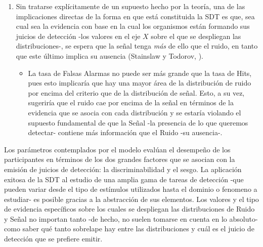 \begin{enumerate}
\item Sin tratarse explícitamente de un supuesto hecho por la teoría, una de las implicaciones directas de la forma en que está constituida la SDT es que, sea cual sea la evidencia con base en la cual los organismos están formando sus juicios de detección -los valores en el eje $X$ sobre el que se despliegan las distribuciones-, se espera que la señal tenga \textit{más} de ello que el ruido, en tanto que este último implica su ausencia (Stainslaw y Todorov, \citeyear{Stainslaw1999}).\\
  \begin{itemize}

  \item La tasa de Falsas Alarmas no puede ser más grande que la tasa de Hits, pues esto implicaría que hay una mayor área de la distribución de ruido por encima del criterio que de la distribución de señal. Esto, a su vez, sugeriría que el ruido cae por encima de la señal en términos de la evidencia que se asocia con cada distribución y se estaría violando el supuesto fundamental de que la Señal -la presencia de lo que queremos detectar- contiene más información que el Ruido -su ausencia-.\\
  \end{itemize}
\end{enumerate}

Los parámetros contemplados por el modelo evalúan el desempeño de los participantes en términos de los dos grandes factores que se asocian con la emisión de juicios de detección: la discriminabilidad y el sesgo. La aplicación exitosa de la SDT al estudio de una amplia gama de tareas de detección -que pueden variar desde el tipo de estímulos utilizados hasta el dominio o fenomeno a estudiar- es posible gracias a la abstracción de sus elementos. Los valores y el tipo de evidencia específicos sobre los cuales se despliegan las distribuciones de Ruido y Señal no importan tanto -de hecho, no suelen tomarse en cuenta en lo absoluto- como saber qué tanto sobrelape hay entre las distribuciones y cuál es el juicio de detección que se prefiere emitir.\\

